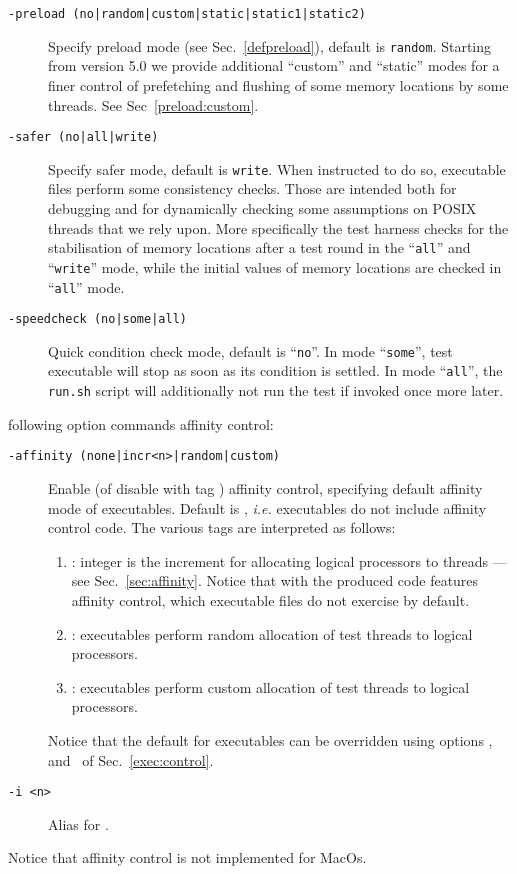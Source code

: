 \begin{description}
\item[{\tt -preload (no|random|custom|static|static1|static2)}]
Specify preload mode (see Sec.~\ref{defpreload}), default is \texttt{random}.
Starting from version 5.0 we provide additional ``custom'' and ``static''
modes for a finer control of prefetching and flushing of some memory locations
by some threads. See Sec~\ref{preload:custom}.
\item[{\tt -safer (no|all|write)}] Specify safer mode,
default is \texttt{write}.
When instructed to do so, executable files perform some consistency checks.
Those are intended both for debugging and for dynamically checking
some assumptions on POSIX threads that we rely upon.
More specifically the test harness checks for the stabilisation of
memory locations after a test round in the ``\texttt{all}'' and
``\texttt{write}'' mode, while
the initial values of memory locations are checked in ``\texttt{all}'' mode.
\item[{\tt -speedcheck (no|some|all)}]
Quick condition check mode,
default is ``\texttt{no}''.
In mode ``\texttt{some}'', test executable will stop as soon as its
condition is settled.
In mode ``\texttt{all}'', the \texttt{run.sh} script will additionally
not run the test if invoked once more later.
\end{description}

 following option commands affinity control:
\begin{description}
\item[{\tt -affinity (none|incr<n>|random|custom)}]
Enable (of disable with tag ) affinity control,
specifying default affinity mode of executables.
Default is , \emph{i.e.} executables do not
include affinity control code.
The various tags are interpreted as follows:
\begin{enumerate}
\item {}:
integer  is the increment  for allocating logical
processors to threads --- see Sec.~\ref{sec:affinity}.
Notice that with 
the produced code features affinity control, which executable
files do not exercise by default.
\item {}: executables perform random allocation of
test threads to logical processors.
\item {}: executables perform custom allocation of
test threads to logical processors.
\end{enumerate}
Notice that the default for executables can be overridden using
options , and~
of Sec.~\ref{exec:control}.

\item[{\tt -i <n>}] Alias for .
\end{description}
Notice that affinity control is not implemented for MacOs.


